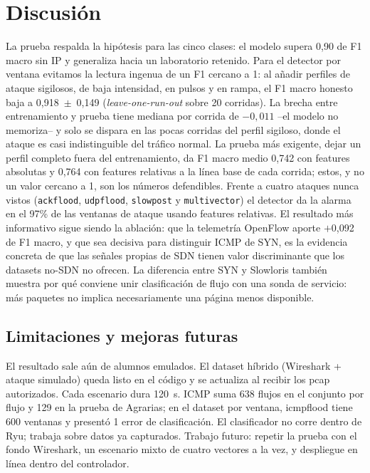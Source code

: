 \documentclass[a4paper,fleqn]{cas-dc}
\begin{document}
\section{Discusión}\label{sec:discusion}
La prueba respalda la hipótesis para las cinco clases: el modelo supera 0,90 de F1 macro sin IP y generaliza hacia un laboratorio retenido. Para el detector por ventana evitamos la lectura ingenua de un F1 cercano a 1: al añadir perfiles de ataque sigilosos, de baja intensidad, en pulsos y en rampa, el F1 macro honesto baja a 0{,}918~$\pm$~0{,}149 (\emph{leave-one-run-out} sobre 20 corridas). La brecha entre entrenamiento y prueba tiene mediana por corrida de $-0{,}011$ --el modelo no memoriza-- y solo se dispara en las pocas corridas del perfil sigiloso, donde el ataque es casi indistinguible del tráfico normal. La prueba más exigente, dejar un perfil completo fuera del entrenamiento, da F1 macro medio 0{,}742 con features absolutas y 0{,}764 con features relativas a la línea base de cada corrida; estos, y no un valor cercano a 1, son los números defendibles. Frente a cuatro ataques nunca vistos (\texttt{ackflood}, \texttt{udpflood}, \texttt{slowpost} y \texttt{multivector}) el detector da la alarma en el 97\% de las ventanas de ataque usando features relativas. El resultado más informativo sigue siendo la ablación: que la telemetría OpenFlow aporte $+$0{,}092 de F1 macro, y que sea decisiva para distinguir ICMP de SYN, es la evidencia concreta de que las señales propias de SDN tienen valor discriminante que los datasets no-SDN no ofrecen. La diferencia entre SYN y Slowloris también muestra por qué conviene unir clasificación de flujo con una sonda de servicio: más paquetes no implica necesariamente una página menos disponible.

\subsection{Limitaciones y mejoras futuras}
El resultado sale aún de alumnos emulados. El dataset híbrido (Wireshark + ataque simulado) queda listo en el código y se actualiza al recibir los pcap autorizados. Cada escenario dura 120~s. ICMP suma 638 flujos en el conjunto por flujo y 129 en la prueba de Agrarias; en el dataset por ventana, icmpflood tiene 600 ventanas y presentó 1 error de clasificación. El clasificador no corre dentro de Ryu; trabaja sobre datos ya capturados. Trabajo futuro: repetir la prueba con el fondo Wireshark, un escenario mixto de cuatro vectores a la vez, y despliegue en línea dentro del controlador.
\end{document}
